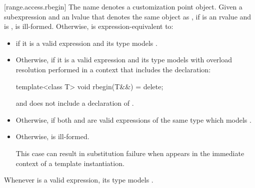 [range.access.rbegin]{}
\pnum
The name  denotes a customization point
object.
Given a subexpression  and
an lvalue  that denotes the same object as ,
if  is an rvalue and
 is ,
 is ill-formed.
Otherwise,
 is
expression-equivalent to:
\begin{itemize}
\item
  if it is a valid expression and its type  models
  .

\item
  Otherwise,  if it is a valid
  expression and its type  models
   with overload
  resolution performed in a context that includes the declaration:
\begin{codeblock}
template<class T> void rbegin(T&&) = delete;
\end{codeblock}
  and does not include a declaration of .

\item
  Otherwise,  if both
   and  are valid
  expressions of the same type  which models
  .

\item
  Otherwise,  is ill-formed.
  \begin{note}
  This case can result in substitution failure when 
  appears in the immediate context of a template instantiation.
  \end{note}
\end{itemize}

\pnum
\begin{note}
Whenever  is a valid expression, its type models
.
\end{note}


